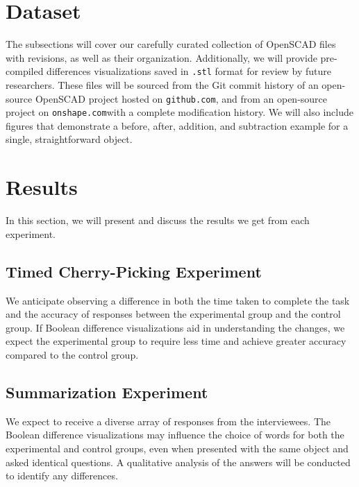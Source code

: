 \documentclass[sigconf,authorversion,nonacm]{acmart}
\begin{document}
\section{Dataset}

The subsections will cover our carefully curated collection of OpenSCAD files with revisions, as well as their organization. Additionally, we will provide pre-compiled differences visualizations saved in \texttt{.stl} format for review by future researchers. These files will be sourced from the Git commit history of an open-source OpenSCAD project hosted on \texttt{github.com}, and from an open-source project on \texttt{onshape.com}with a complete modification history.
We will also include figures that demonstrate a before, after, addition, and subtraction example for a single, straightforward object.

\section{Results}

In this section, we will present and discuss the results we get from each experiment.
\subsection{Timed Cherry-Picking Experiment}
We anticipate observing a difference in both the time taken to complete the task and the accuracy of responses between the experimental group and the control group. If Boolean difference visualizations aid in understanding the changes, we expect the experimental group to require less time and achieve greater accuracy compared to the control group.

\subsection{Summarization Experiment}
We expect to receive a diverse array of responses from the interviewees. The Boolean difference visualizations may influence the choice of words for both the experimental and control groups, even when presented with the same object and asked identical questions. A qualitative analysis of the answers will be conducted to identify any differences.
\end{document}
